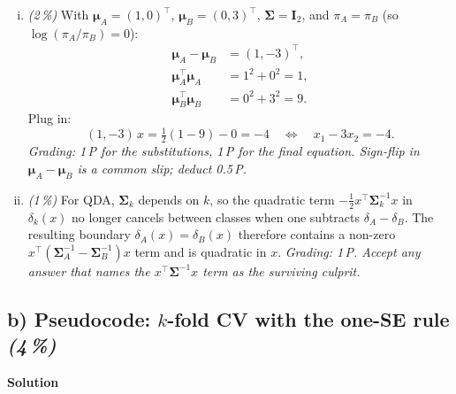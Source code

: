 \documentclass[11pt,a4paper]{article}
\newcommand{\subpoints}[1]{\textit{(#1\,\%)}}
\newcommand{\sol}{\noindent\textbf{Solution}}
\begin{document}
\begin{enumerate}[(i)]
  \item \subpoints{2} With $\boldsymbol\mu_A = (1,0)^\top$, $\boldsymbol\mu_B = (0,3)^\top$,
        $\boldsymbol\Sigma = \mathbf{I}_2$, and $\pi_A = \pi_B$ (so $\log(\pi_A/\pi_B) = 0$):
        \begin{align*}
        \boldsymbol\mu_A - \boldsymbol\mu_B &= (1, -3)^\top, \\
        \boldsymbol\mu_A^\top \boldsymbol\mu_A &= 1^2 + 0^2 = 1, \\
        \boldsymbol\mu_B^\top \boldsymbol\mu_B &= 0^2 + 3^2 = 9.
        \end{align*}
        Plug in:
        $$(1, -3) \, x = \tfrac{1}{2}(1 - 9) - 0 = -4
          \quad\Longleftrightarrow\quad \boxed{x_1 - 3 x_2 = -4}.$$
        \emph{Grading: 1\,P for the substitutions, 1\,P for the final equation. Sign-flip in
        $\boldsymbol\mu_A - \boldsymbol\mu_B$ is a common slip; deduct 0.5\,P.}

  \item \subpoints{1} For QDA, $\boldsymbol\Sigma_k$ depends on $k$, so the quadratic term
        $-\tfrac{1}{2} x^\top \boldsymbol\Sigma_k^{-1} x$ in $\delta_k(x)$ no longer cancels
        between classes when one subtracts $\delta_A - \delta_B$. The resulting boundary
        $\delta_A(x) = \delta_B(x)$ therefore contains a non-zero $x^\top(\boldsymbol\Sigma_A^{-1}
        - \boldsymbol\Sigma_B^{-1})x$ term and is quadratic in $x$.
        \emph{Grading: 1\,P. Accept any answer that names the $x^\top \boldsymbol\Sigma^{-1} x$
        term as the surviving culprit.}
\end{enumerate}

\subsection*{b) Pseudocode: $k$-fold CV with the one-SE rule \subpoints{4}}
\sol{}
\end{document}
